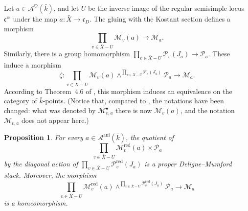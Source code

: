 \documentclass[12pt,english]{smfart}
\numberwithin{equation}{subsection}
\newtheorem{proposition}[equation]{Proposition}
\theoremstyle{remark}
\begin{document}
Let $a\in\mathcal{A}^\heartsuit(\bar{k})$, and let $U$ be the inverse image of the regular semisimple
locus $\mathfrak{c}^\mathrm{rs}$ under the map $a:\bar X\rightarrow \mathfrak{c}_D$.
The gluing with the Kostant section defines a morphism
$$
\prod_{v\in\bar X-U}\mathcal{M}_v(a)\longrightarrow \mathcal{M}_a.
$$
Similarly, there is a group homomorphism $\prod_{v\in \bar X-U}\mathcal{P}_v(J_a)\longrightarrow \mathcal{P}_a$.
These induce a morphism
$$
\zeta:\prod_{v\in\bar X-U}\mathcal{M}_v(a)
\wedge^{\prod_{v\in\bar X-U}\mathcal{P}_v(J_a)} \mathcal{P}_a
\longrightarrow \mathcal{M}_a.
$$
According to Theorem~4.6 of \cite{N}, this morphism induces an equivalence on the category of $\bar{k}$-points.
(Notice that, compared to \cite{N}, the notations have been changed: what was denoted
by $\mathcal{M}_{v,a}^\bullet$ there is now $\mathcal{M}_v(a)$, and the notation $\mathcal{M}_{v,a}$ does not appear here.)

\begin{proposition}\label{produit}
For every $a\in\mathcal{A}^\mathrm{ani}(\bar{k})$, the quotient of
$$
\prod_{v\in\bar X-U}\mathcal{M}_v^{\mathrm{red}}(a)\times \mathcal{P}_a
$$
by the diagonal action of $\prod_{v\in\bar X-U}\mathcal{P}_v^{\mathrm{red}}(J_a)$ is a proper Deligne--Mumford stack.
Moreover, the morphism
$$
\prod_{v\in\bar X-U}\mathcal{M}_v^{\mathrm{red}}(a)
\wedge^{\prod_{v\in\bar X-U}\mathcal{P}_v^{\mathrm{red}}(J_a)} \mathcal{P}_a
\longrightarrow \mathcal{M}_a
$$
is a homeomorphism.
\end{proposition}
\end{document}
